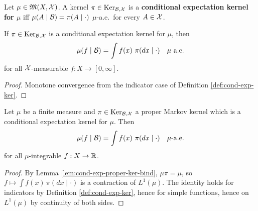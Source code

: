 \begin{definition}
    \label{def:cond-exp-ker}
    \leanok{}

    Let $\mu\in\mathfrak{M}(X,\mathcal{X})$. A kernel $\pi\in\text{Ker}_{\mathcal{B},\mathcal{X}}$ is a
    \textbf{conditional expectation kernel for $\mu$} iff $\mu(A\mid \mathcal{B})=\pi(A\mid\cdot)$
    $\mu$-a.e.\ for every $A \in \mathcal{X}$.
\end{definition}

\begin{lemma}
    \label{lem:cond-exp-proper-ker-lintegral}

    If $\pi \in \text{Ker}_{\mathcal{B}, \mathcal{X}}$ is a conditional expectation kernel for $\mu$, then
    \[\mu(f\mid \MCB) = \int f(x)\ \pi(dx\mid\cdot)\quad \mu\text{-a.e.}\]
    for all $\mathcal{X}$-measurable $f : X \to [0, \infty]$.
\end{lemma}
\begin{proof}

    Monotone convergence from the indicator case of Definition \ref{def:cond-exp-ker}.
\end{proof}

\begin{lemma}
    \label{lem:cond-exp-proper-ker-integral}
    \leanok

    Let $\mu$ be a finite measure and $\pi \in \text{Ker}_{\mathcal{B}, \mathcal{X}}$ a proper Markov kernel
    which is a conditional expectation kernel for $\mu$. Then
    \[\mu(f\mid \MCB) = \int f(x)\ \pi(dx\mid\cdot)\quad \mu\text{-a.e.}\]
    for all $\mu$-integrable $f : X \to \mathbb{R}$.
\end{lemma}
\begin{proof}

    By Lemma \ref{lem:cond-exp-proper-ker-bind}, $\mu\pi = \mu$, so
    $f \mapsto \int f(x)\,\pi(dx\mid\cdot)$ is a contraction of $L^1(\mu)$. The identity holds for
    indicators by Definition \ref{def:cond-exp-ker}, hence for simple functions, hence on
    $L^1(\mu)$ by continuity of both sides.
\end{proof}

